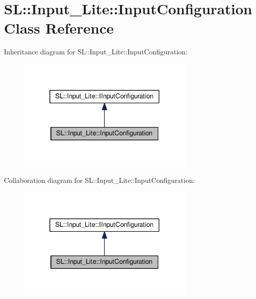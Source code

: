 \hypertarget{class_s_l_1_1_input___lite_1_1_input_configuration}{}\section{SL\+:\+:Input\+\_\+\+Lite\+:\+:Input\+Configuration Class Reference}
\label{class_s_l_1_1_input___lite_1_1_input_configuration}


Inheritance diagram for SL\+:\+:Input\+\_\+\+Lite\+:\+:Input\+Configuration\+:
\nopagebreak
\begin{figure}[H]
\begin{center}
\leavevmode
\includegraphics[width=246pt]{class_s_l_1_1_input___lite_1_1_input_configuration__inherit__graph}
\end{center}
\end{figure}


Collaboration diagram for SL\+:\+:Input\+\_\+\+Lite\+:\+:Input\+Configuration\+:
\nopagebreak
\begin{figure}[H]
\begin{center}
\leavevmode
\includegraphics[width=246pt]{class_s_l_1_1_input___lite_1_1_input_configuration__coll__graph}
\end{center}
\end{figure}
